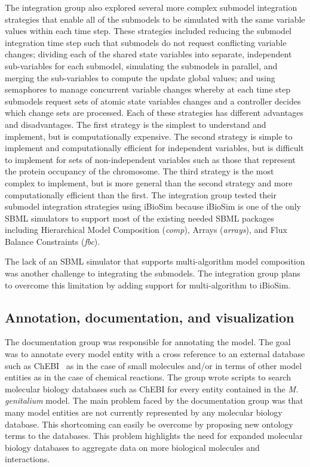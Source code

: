 \documentclass[journal,transmag]{IEEEtran}
\begin{document}
The integration group also explored several more complex submodel integration strategies that enable all of the submodels to be simulated with the same variable values within each time step. These strategies included reducing the submodel integration time step such that submodels do not request conflicting variable changes; dividing each of the shared state variables into separate, independent sub-variables for each submodel, simulating the submodels in parallel, and merging the sub-variables to compute the update global values; and using semaphores to manage concurrent variable changes whereby at each time step submodels request sets of atomic state variables changes and a controller decides which change sets are processed. Each of these strategies has different advantages and disadvantages. The first strategy is the simplest to understand and implement, but is computationally expensive. The second strategy is simple to implement and computationally efficient for independent variables, but is difficult to implement for sets of non-independent variables such as those that represent the protein occupancy of the chromosome. The third strategy is the most complex to implement, but is more general than the second strategy and more computationally efficient than the first. The integration group tested their submodel integration strategies using iBioSim because iBioSim is one of the only SBML simulators to support most of the existing needed SBML packages including Hierarchical Model Composition (\emph{comp}), Arrays (\emph{arrays}), and Flux Balance Constraints (\emph{fbc}).

The lack of an SBML simulator that supports multi-algorithm model composition was another challenge to integrating the submodels. The integration group plans to overcome this limitation by adding support for multi-algorithm to iBioSim.

\subsection{Annotation, documentation, and visualization}
The documentation group was responsible for annotating the model.
The goal was to annotate every model entity with a cross reference to an external database such as ChEBI~\cite{Hastings2013} as in the case of small molecules and/or in terms of other model entities as in the case of chemical reactions.
The group wrote scripts to search molecular biology databases such as ChEBI for every entity contained in the \textit{M. genitalium} model.
The main problem faced by the documentation group was that many model entities are not currently represented by any molecular biology database.
This shortcoming can easily be overcome by proposing new ontology terms to the databases.
This problem highlights the need for expanded molecular biology databases to aggregate data on more biological molecules and interactions. 
\end{document}
